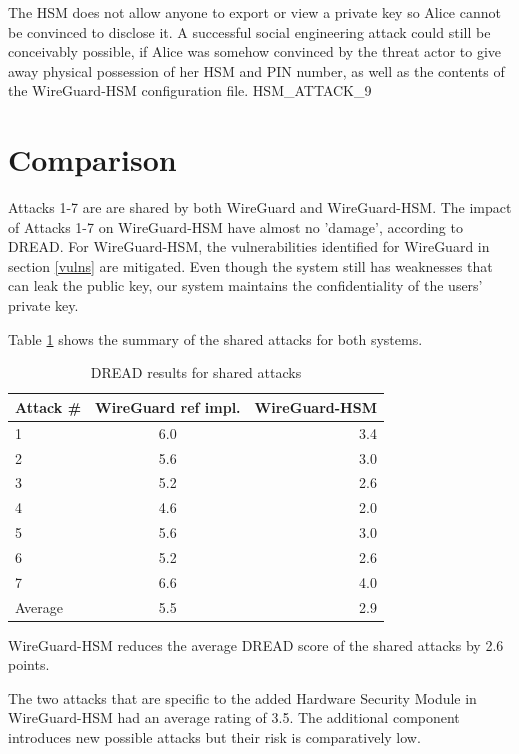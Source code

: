 \documentclass [11pt, proquest] {uwthesis}[2020/02/24]
\begin{document}
The HSM does not allow anyone to export or view a private key so Alice cannot be convinced to disclose it.
A successful social engineering attack could still be conceivably possible, if Alice was somehow convinced by the threat actor to give away physical possession of her HSM and PIN number, as well as the contents of the WireGuard-HSM configuration file.
HSM_ATTACK_9


\section{Comparison}
Attacks 1-7 are are shared by both WireGuard and WireGuard-HSM. The impact of Attacks 1-7 on WireGuard-HSM have almost no 'damage', according to DREAD. For WireGuard-HSM, the vulnerabilities identified for WireGuard in section \ref{vulns} are mitigated. Even though the system still has weaknesses that can leak the public key, our system maintains the confidentiality of the users' private key.

Table \ref{tab:DREAD_AVG} shows the summary of the shared attacks for both systems.

\begin{table}[h!]
  \begin{center}
    \caption{DREAD results for shared attacks}
    \label{tab:DREAD_AVG}
    \begin{tabular}{l|c|r} %
      \textbf{Attack \#} & \textbf{WireGuard ref impl.} & \textbf{WireGuard-HSM}\\
      \hline
      1 & 6.0 & 3.4\\
      2 & 5.6 & 3.0\\
      3 & 5.2 & 2.6\\
      4 & 4.6 & 2.0\\
      5 & 5.6 & 3.0\\
      6 & 5.2 & 2.6\\
      7 & 6.6 & 4.0\\
    \hline
    Average & 5.5 & 2.9\\
    \end{tabular}
  \end{center}
\end{table}

WireGuard-HSM reduces the average DREAD score of the shared attacks by 2.6 points.

The two attacks that are specific to the added Hardware Security Module in WireGuard-HSM had an average rating of 3.5.
The additional component introduces new possible attacks but their risk is comparatively low. 
\end{document}
